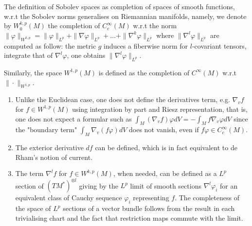 \documentclass[11pt]{article}
\begin{document}
The definition of Sobolev spaces as completion of spaces of smooth functions, w.r.t the
Sobolev norms generalises on Riemannian manifolds, namely, we denote by \(W_0^{k,p}(M)\)
the completion of \(C_c^\infty(M)\) w.r.t the norm
\(\|\varphi\|_{W^{k,p}} = \|\varphi\|_{L^p} + \|\nabla \varphi \|_{L^p} + \dots + \|\nabla^k \varphi \|_{L^p}\)
where \(\|\nabla^l\varphi\|_{L^p}\) are computed as follow: the metric \(g\) induces a
fiberwise norm for \(l\)-covariant tensors, integrate that of \(\nabla^l \varphi\), one
obtains \(\|\nabla^l\varphi\|_{L^p}\).

Similarly, the space \(W^{1,p}(M)\) is defined as the completion of \(C^\infty(M)\) w.r.t \(\|\cdot\|_{W^{1,p}}\). 

\begin{remark}
\label{rem:sobolev-def}
\begin{enumerate}
\item Unlike the Euclidean case, one does not define the derivatives term, e.g. \(\nabla_v f\) for \(f\in W^{1,p}(M)\) using integration by part and Riesz representation,
that is, one does not expect a formular such as \(\int_M (\nabla_v f)\varphi dV = -\int_M
   f\nabla_v \varphi dV\) since the "boundary term" \(\int_{M}\nabla_v(f\varphi) dV\) does not vanish, even if \(f\varphi \in C_c^\infty(M)\).
\item The exterior derivative \(df\) can be defined, which is in fact equivalent to de
Rham's notion of current.
\item The term \(\nabla^l f\) for \(f\in W^{k,p}(M)\), when needed, can be defined as a \(L^p\) section of \((TM^*)^{\otimes l}\) giving by the \(L^p\) limit of smooth
sections \(\nabla^l\varphi_i\) for an equivalent class of Cauchy sequence \(\varphi_i\) representing \(f\). The completeness of the space of \(L^p\) sections
of a vector bundle follows from the result in each trivialising chart and the fact that restriction maps
commute with the limit.
\end{enumerate}
\end{remark}
\end{document}
